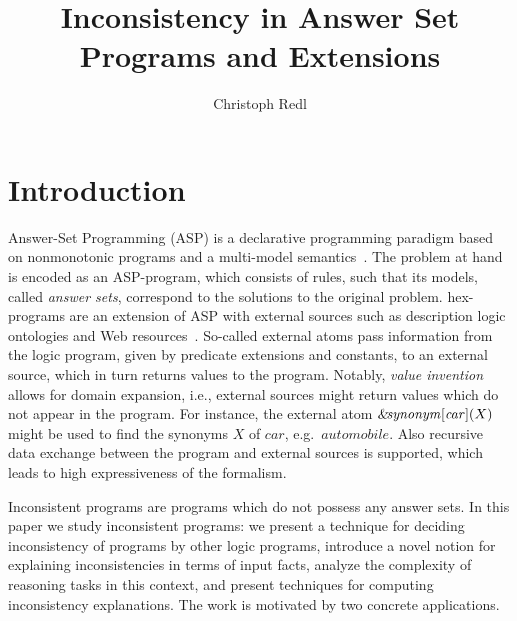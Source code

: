 \documentclass[11pt,fleqn,twoside]{article}
\title{Inconsistency in Answer Set Programs and Extensions}
\author{
Christoph Redl\affiliation{
Institut f\"ur Logic and Computation, Technische Universit\"at Wien,
Favoritenstra\ss{}e\ 9-11, A-1040 Vienna, Austria;
email: redl@kr.tuwien.ac.at.}
}
\newcommand\hex{{\sc hex}\xspace}
\newcommand{\amp}[1]{\ensuremath{\text{\textsl{{\&}}}\!\mathit{#1}}}
\newcommand{\ext}[3]{\ensuremath{\amp{#1}[#2](#3)}}
\begin{document}
\maketitle
\tableofcontents
\newpage

	\section{Introduction}
	\label{sec:introduction}

		Answer-Set Programming (ASP) is a declarative programming paradigm
		based on nonmonotonic programs and a multi-model semantics~\cite{gelf-lifs-91}.
		The problem at hand is encoded as an ASP-program, which consists of rules,
		such that its models, called \emph{answer sets}, correspond to the solutions to the original problem.
		\hex{}-programs are an extension of ASP with external sources
		such as description logic ontologies and Web resources~\cite{DBLP:conf/birthday/EiterRS16}.
		So-called external atoms pass information from the logic program,
		given by predicate extensions and constants, to an external source, which in turn
		returns values to the program.
		Notably, \emph{value invention} allows for
		domain expansion, i.e., external sources might return values which do not appear
		in the program.
		For instance, the external atom $\ext{\mathit{synonym}}{\mathit{car}}{X}$
		might be used to find the synonyms $X$ of $\mathit{car}$, e.g.~$\mathit{automobile}$.
		Also recursive data exchange between the program and external sources
		is supported, which leads to high expressiveness of the formalism.

		Inconsistent programs are programs which do not possess any answer sets.
		In this paper we study inconsistent programs:
		we present a technique for deciding inconsistency of programs by other logic programs,
		introduce a novel notion for explaining inconsistencies in terms of input facts,
		analyze the complexity of reasoning tasks in this context, and present techniques for computing inconsistency explanations.
		The work is motivated by two concrete applications.
		
\end{document}
